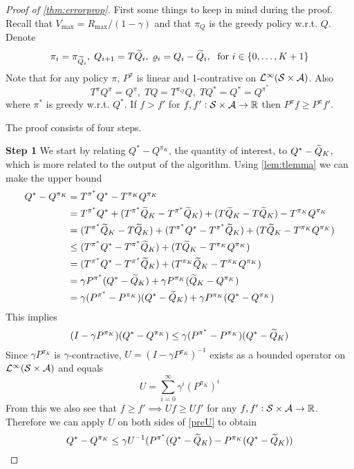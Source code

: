\begin{proof}[Proof of \cref{thm:errorprop}] 
  First some things to keep in mind during the proof.
  Recall that $V_{\max} = R_{\max} / (1 - \gamma)$ and that
  $\pi_Q$ is the greedy policy w.r.t. $Q$.
  Denote 
  \[ \pi_i = \pi_{\widetilde{Q}_i},
    \; Q_{i+1} = T \widetilde{Q}_{i},
  \; \varrho_{i} = Q_{i} - \widetilde{Q}_{i},
\; \mbox{ for } i \in \{0,\dots,K+1\} \]
  Note that for any policy $\pi$,
  $P^{\pi}$ is linear and 1-contrative on
  $\mathcal{L}^\infty(\mathcal{S} \times \mathcal{A})$. %
  Also \[ T^{\pi} Q^{\pi} = Q^{\pi}, \;
    T Q = T^{\pi_Q} Q, \;
  T Q^* = Q^* = Q^{\pi^*} \]
  where $\pi^*$ is greedy w.r.t. $Q^*$. 
  If $f > f'$ for $f,f':\mathcal{S}\times \mathcal{A} \to \mathbb{R}$
  then $P^{\pi} f \geq P^{\pi} f'$. %
  
  The proof consists of four steps.

  \textbf{Step 1}
  We start by relating $Q^* - Q^{\pi_K}$, the quantity of interest,
  to $Q^* - \widetilde{Q}_K$, which is more related to the output of the algorithm.
  Using \cref{lem:tlemma} we can make the upper bound
  \begin{align}
    Q^* - Q^{\pi_K} &= T^{\pi^*} Q^* - T^{\pi_K} Q^{\pi_K} \notag
    \\ &= T^{\pi^*} Q^* + (T^{\pi^*} \widetilde{Q}_K - T^{\pi^*} \widetilde{Q}_K)
    + (T \widetilde{Q}_K - T \widetilde{Q}_K)- T^{\pi_K} Q^{\pi_K} \notag
    \\ &= (T^{\pi^*} \widetilde{Q}_K - T \widetilde{Q}_K)
    + (T^{\pi^*} Q^* - T^{\pi^*} \widetilde{Q}_K) 
    + (T \widetilde{Q}_K - T^{\pi_K} Q^{\pi_K}) \notag
    \\ &\leq (T^{\pi^*} Q^* - T^{\pi^*} \widetilde{Q}_K) 
    + (T \widetilde{Q}_K - T^{\pi_K} Q^{\pi_K}) \notag
    \\ &= (T^{\pi^*} Q^* - T^{\pi^*} \widetilde{Q}_K) 
    + (T^{\pi_K} \widetilde{Q}_K - T^{\pi_K} Q^{\pi_K}) \notag
    \\ &= \gamma P^{\pi^*} (Q^* - \widetilde{Q}_K)
    + \gamma P^{\pi_K} (\widetilde{Q}_K - Q^{\pi_K}) \notag
    \\ &= \gamma (P^{\pi^*} - P^{\pi_K})(Q^* - \widetilde{Q}_K)
    + \gamma P^{\pi_K} (Q^* - Q^{\pi_K}) \label{preU}
  \end{align}
  This implies
  \[ (I - \gamma P^{\pi_K})(Q^* - Q^{\pi_K})
  \leq \gamma (P^{\pi^*} - P^{\pi_K})(Q^* - \widetilde{Q}_K) \]
  Since $\gamma P^{\pi_K}$ is $\gamma$-contractive,
  $U = (I - \gamma P^{\pi_K})^{-1}$ exists as a bounded operator on
  $\mathcal{L}^\infty(\mathcal{S}\times \mathcal{A})$ and equals
  \[ U = \sum_{i=0}^\infty \gamma^i (P^{\pi_K})^i \] 
  From this we also see that $f \geq f' \implies U f \geq U f'$ for any
  $f, f' : \mathcal{S}\times \mathcal{A} \to \mathbb{R}$.
  Therefore we can apply $U$ on both sides of \cref{preU} to obtain 
  \begin{equation} Q^* - Q^{\pi_K} \leq \gamma U^{-1}(P^{\pi^*}(Q^* - \widetilde{Q}_K)
  - P^{\pi_K} (Q^* - \widetilde{Q}_K)) \label{eq:qq1} \end{equation} 


\end{proof}
